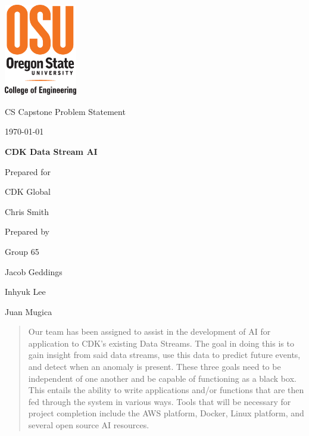\documentclass[onecolumn, draftclsnofoot,10pt, compsoc]{IEEEtran}
\def \CapstoneTeamName{		GROUP65}
\def \CapstoneTeamNumber{		65}
\def \GroupMemberOne{			Jacob Geddings}
\def \GroupMemberTwo{			Inhyuk Lee}
\def \GroupMemberThree{			Juan Mugica}
\def \CapstoneProjectName{		CDK Data Stream AI}
\def \CapstoneSponsorCompany{	CDK Global}
\def \CapstoneSponsorPerson{		Chris Smith}
\def \DocType{		Problem Statement
				}
\newcommand{\NameSigPair}[1]{\par
\makebox[2.75in][r]{#1} \hfil 	\makebox[3.25in]{\makebox[2.25in]{\hrulefill} \hfill		\makebox[.75in]{\hrulefill}}
\par\vspace{-12pt} \textit{\tiny\noindent
\makebox[2.75in]{} \hfil		\makebox[3.25in]{\makebox[2.25in][r]{Signature} \hfill	\makebox[.75in][r]{Date}}}}
\renewcommand{\NameSigPair}[1]{#1}
\begin{document}
\begin{titlepage}
    \begin{singlespace}
    	\includegraphics[height=4cm]{coe_v_spot1}
        \hfill 
        \par\vspace{.2in}
        \centering
        \scshape{
            \huge CS Capstone \DocType \par
            {\large\today}\par
            \vspace{.5in}
            \textbf{\Huge\CapstoneProjectName}\par
            \vfill
            {\large Prepared for}\par
            \Huge \CapstoneSponsorCompany\par
            \vspace{5pt}
            {\Large\NameSigPair{\CapstoneSponsorPerson}\par}
            {\large Prepared by }\par
            Group\CapstoneTeamNumber\par
            \vspace{5pt}
            {\Large
                \NameSigPair{\GroupMemberOne}\par
                \NameSigPair{\GroupMemberTwo}\par
                \NameSigPair{\GroupMemberThree}\par
            }
            \vspace{20pt}
        }
        \begin{abstract}
		Our team has been assigned to assist in the development of AI for application to CDK’s existing Data Streams. 
		The goal in doing this is to gain insight from said data streams, use this data to predict future events, and detect when an anomaly is present. 
		These three goals need to be independent of one another and be capable of functioning as a black box. 
		This entails the ability to write applications and/or functions that are then fed through the system in various ways. 
		Tools that will be necessary for project completion include the AWS platform, Docker, Linux platform, and several open source AI resources.	
        \end{abstract}     
    \end{singlespace}
\end{titlepage}
\end{document}
